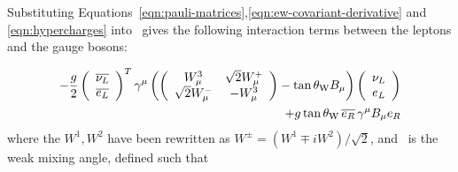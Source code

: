 

Substituting
Equations~\ref{eqn:pauli-matrices},\ref{eqn:ew-covariant-derivative} and \ref{eqn:hypercharges}
 into~ gives the following
interaction terms between the leptons and the gauge bosons:

\begin{equation}
\begin{split}
- \frac{g}{2}
\left( \begin{array}{c}\overline{\nu_{L}} \\  \overline{e_{L}} \end{array} \right)^{T}
\gamma^{\mu} \left(
\left( \begin{array}{cc} W^{3}_{\mu} & \sqrt{2} W^{+}_{\mu} \\ \sqrt{2} W^{-}_{\mu} & -
W^{3}_{\mu} \end{array} \right)
- \tan{\ensuremath{\theta_{\mathrm{W}}}} B_{\mu} \right)
\left( \begin{array}{c} \nu_{L} \\  e_{L} \end{array} \right) \\
+ g \tan{\ensuremath{\theta_{\mathrm{W}}}} \, \overline{e_{R}} \, \gamma^{\mu} B_{\mu} e_{R}
\end{split}
\label{eqn:ew-lepton-interactions}
\end{equation}
where the $W^{1}, W^{2}$ have been rewritten as $W^{\pm} = (W^{1} \mp
iW^{2})/\sqrt{2}$, and \thetaW\ is the weak mixing angle, defined such that

